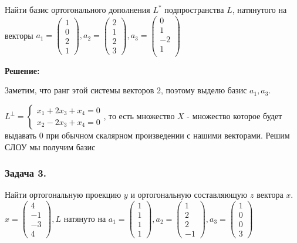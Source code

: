 Найти базис ортогонального дополнения $L^*$ подпространства $L$, натянутого на векторы $a_1 = \begin{pmatrix}
    1 \\
    0\\
    2\\
    1
\end{pmatrix}, a_2 = \begin{pmatrix}
    2 \\
    1 \\ 
    2 \\
    3 
\end{pmatrix}, a_3 = \begin{pmatrix}
    0 \\
    1 \\
    -2\\
    1 \\
\end{pmatrix}$

\textbf{Решение:}

Заметим, что ранг этой системы векторов 2, поэтому выделю базис $a_1,a_3$.

$L^\perp = \begin{cases}
    x_1 + 2x_3 +x_4 = 0\\
    x_2 - 2x_3 + x_4 = 0
\end{cases}$, то есть множество $X$ - множество которое будет выдавать 0 при обычном скалярном произведении с нашими векторами. Решим СЛОУ мы получим базис

\subsubsection{Задача 3.}

Найти ортогональную проекцию $y$ и ортогональную составляющую $z$ вектора $x$. $x = \begin{pmatrix}
    4 \\
    -1 \\
    -3 \\
    4
\end{pmatrix}, L$ натянуто на $a_1 = \begin{pmatrix}
    1 \\
    1\\1\\1
\end{pmatrix}, a_2 =  \begin{pmatrix}
    1 \\
    2 \\
    2 \\
    -1
\end{pmatrix}, a_3 = \begin{pmatrix}
    1 \\
    0\\
    0\\
    3
\end{pmatrix}$

